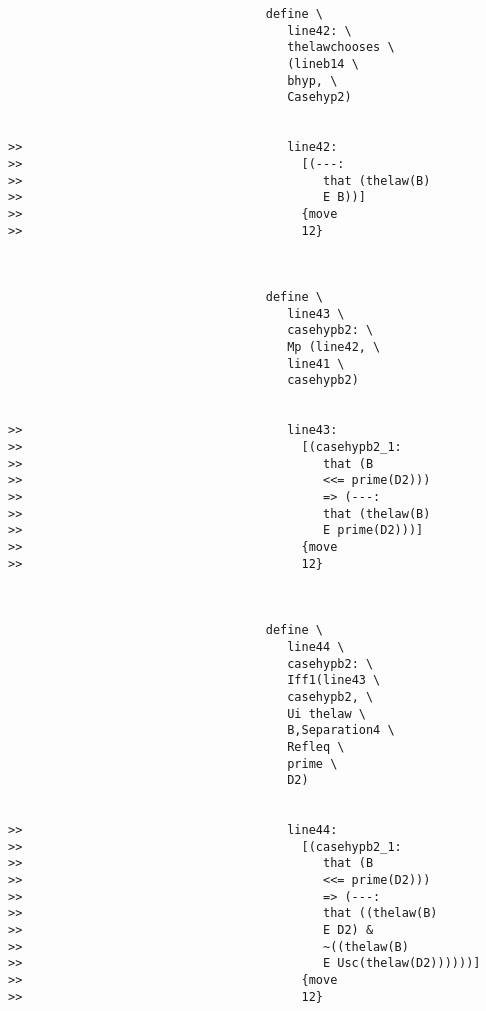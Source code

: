 \documentclass[12pt]{article}
\begin{document}
\begin{verbatim}
                                    define \
                                       line42: \
                                       thelawchooses \
                                       (lineb14 \
                                       bhyp, \
                                       Casehyp2)


>>                                     line42:
>>                                       [(---:
>>                                          that (thelaw(B)
>>                                          E B))]
>>                                       {move
>>                                       12}



                                    define \
                                       line43 \
                                       casehypb2: \
                                       Mp (line42, \
                                       line41 \
                                       casehypb2)


>>                                     line43:
>>                                       [(casehypb2_1:
>>                                          that (B
>>                                          <<= prime(D2)))
>>                                          => (---:
>>                                          that (thelaw(B)
>>                                          E prime(D2)))]
>>                                       {move
>>                                       12}



                                    define \
                                       line44 \
                                       casehypb2: \
                                       Iff1(line43 \
                                       casehypb2, \
                                       Ui thelaw \
                                       B,Separation4 \
                                       Refleq \
                                       prime \
                                       D2)


>>                                     line44:
>>                                       [(casehypb2_1:
>>                                          that (B
>>                                          <<= prime(D2)))
>>                                          => (---:
>>                                          that ((thelaw(B)
>>                                          E D2) &
>>                                          ~((thelaw(B)
>>                                          E Usc(thelaw(D2))))))]
>>                                       {move
>>                                       12}




\end{verbatim}
\end{document}
